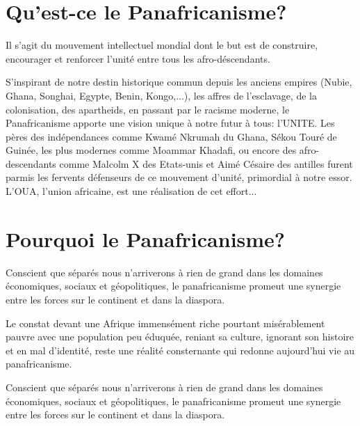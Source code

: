 
	\section{Qu'est-ce le Panafricanisme?}
	Il s'agit du mouvement intellectuel mondial dont le but est de construire, encourager et renforcer l'unité entre tous les afro-déscendants. 
	
	S'inspirant de notre destin historique commun depuis les anciens empires (Nubie, Ghana, Songhai, Egypte, Benin, Kongo,...), 
	les affres de l'esclavage, de la colonisation, des apartheids, en passant par le racisme moderne, 
	le Panafricanisme apporte une vision unique à notre futur à tous: l'UNITE.
	Les pères des indépendances comme Kwamé Nkrumah du Ghana, Sékou Touré de Guinée, les plus modernes comme Moammar Khadafi, ou encore des afro-descendants comme Malcolm X des Etats-unis et Aimé Césaire des antilles furent parmis les fervents défenseurs de ce mouvement d'unité, primordial à notre essor.
	L'OUA, l'union africaine, est une réalisation de cet effort...

	\clearpage
	\section{Pourquoi le Panafricanisme?}
	Conscient que séparés nous n'arriverons à rien de grand dans les domaines économiques, sociaux et géopolitiques, 
	le panafricanisme promeut une synergie entre les forces sur le continent et dans la diaspora.
	
	Le constat devant une Afrique immensément riche pourtant misérablement pauvre avec une population peu éduquée, reniant sa culture,
	ignorant son histoire et en mal d'identité, reste une réalité consternante qui redonne aujourd'hui vie au panafricanisme.
	
	Conscient que séparés nous n'arriverons à rien de grand dans les domaines économiques, sociaux et géopolitiques, 
	le panafricanisme promeut une synergie entre les forces sur le continent et dans la diaspora.
	

